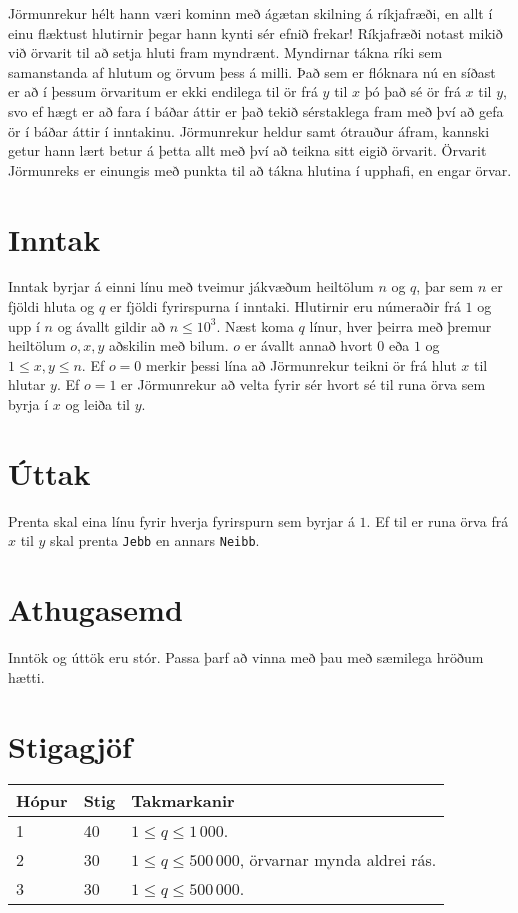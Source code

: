 
Jörmunrekur hélt hann væri kominn með ágætan skilning á ríkjafræði, en allt í einu flæktust hlutirnir þegar hann kynti sér efnið
frekar! Ríkjafræði notast mikið við örvarit til að setja hluti fram myndrænt. Myndirnar tákna ríki sem samanstanda af hlutum og
örvum þess á milli. Það sem er flóknara nú en síðast er að í þessum örvaritum er ekki endilega til ör frá
$y$ til $x$ þó það sé ör frá $x$ til $y$, svo ef hægt er að fara í báðar áttir er það tekið sérstaklega fram með því
að gefa ör í báðar áttir í inntakinu. Jörmunrekur heldur samt ótrauður áfram, kannski getur hann lært betur á þetta allt með því að teikna
sitt eigið örvarit. Örvarit Jörmunreks er einungis með punkta til að tákna hlutina í upphafi, en engar örvar.

\section*{Inntak}
Inntak byrjar á einni línu með tveimur jákvæðum heiltölum $n$ og $q$, þar sem $n$ er fjöldi hluta og $q$ er fjöldi fyrirspurna í inntaki.
Hlutirnir eru númeraðir frá $1$ og upp í $n$ og ávallt gildir að $n \leq 10^3$. 
Næst koma $q$ línur, hver þeirra með þremur heiltölum $o, x, y$ aðskilin með bilum.
$o$ er ávallt annað hvort $0$ eða $1$ og $1 \leq x, y \leq n$. Ef $o = 0$ merkir þessi lína að Jörmunrekur teikni ör frá hlut $x$
til hlutar $y$. Ef $o = 1$ er Jörmunrekur að velta fyrir sér hvort sé til runa örva sem byrja í $x$ og leiða til $y$.

\section*{Úttak}
Prenta skal eina línu fyrir hverja fyrirspurn sem byrjar á $1$. Ef til er runa örva frá $x$ til $y$ skal prenta \texttt{Jebb} 
en annars \texttt{Neibb}.

\section*{Athugasemd}
Inntök og úttök eru stór. Passa þarf að vinna með þau með sæmilega hröðum hætti.

\section*{Stigagjöf}
\begin{tabular}{|l|l|l|}
\hline
Hópur & Stig & Takmarkanir \\ \hline
1     & 40   & $1 \leq q \leq 1\,000$. \\ \hline
2     & 30   & $1 \leq q \leq 500\,000$, örvarnar mynda aldrei rás. \\ \hline
3     & 30   & $1 \leq q \leq 500\,000$. \\ \hline
\end{tabular}


